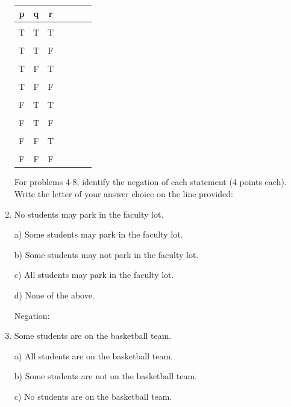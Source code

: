 \documentclass[12pt]{article}
\newcommand{\tab}{\hspace*{2em}}
\begin{document}
\begin{enumerate}
\begin{center}
\begin{tabular}{|c|c|c|c|c|c|c|}

p & q & r  & & &\\
\hline
 \qquad \qquad &  \qquad \qquad& \qquad \qquad&  \qquad\qquad \qquad\qquad&  \qquad \qquad\qquad\qquad&  \qquad \qquad\qquad\qquad \\
T & T& T& & &\\
\hline
& & & & &\\
T &T &F & & &\\
\hline
& & & & &  \\
T &F &T &  &&\\
\hline
& & & & & \\
T &F &F & & &\\
\hline
& & & & &  \\
F &T &T &  &&\\
\hline
& & & & & \\
 F&T & F& & & \\
\hline
& & & & & \\
F &F &T & & & \\
\hline
& & & & &\\
 F&F &F & & &\\
\hline
\end{tabular}
\end{center}

\noindent For problems 4-8, identify the negation of each statement (4 points each).  Write the letter of your answer choice on the line provided:

\item No students may park in the faculty lot.

\tab a) Some students may park in the faculty lot.

\tab b) Some students may not park in the faculty lot.

\tab c) All students may park in the faculty lot.

\tab d) None of the above.

Negation: \underline{\hspace{1.0 in}}

\item Some students are on the basketball team.

\tab a) All students are on the basketball team.

\tab b) Some students are not on the basketball team.

\tab c) No students are on the basketball team.


\end{enumerate}
\end{document}
